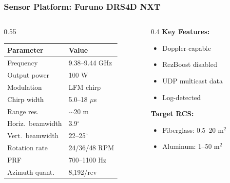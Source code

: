 \documentclass[aspectratio=169, 10pt]{beamer}
\begin{document}
\begin{frame}[shrink=20]
  \frametitle{Sensor Platform: Furuno DRS4D NXT}
  \vspace{-0.35cm}

  \begin{columns}[T]
    \begin{column}{0.55\textwidth}
      \begin{table}
        \centering
        \scriptsize
        \renewcommand{\arraystretch}{0.8}
        \begin{tabular}{@{}ll@{}}
          \toprule
          \textbf{Parameter} & \textbf{Value} \\
          \midrule
          Frequency & 9.38--9.44 GHz \\
          Output power & 100 W \\
          Modulation & LFM chirp \\
          Chirp width & 5.0--18 $\mu$s \\
          Range res. & $\sim$20 m \\
          Horiz.\ beamwidth & 3.9$^{\circ}$ \\
          Vert.\ beamwidth & 22--25$^{\circ}$ \\
          Rotation rate & 24/36/48 RPM \\
          PRF & 700--1100 Hz \\
          Azimuth quant. & 8{,}192/rev \\
          \bottomrule
        \end{tabular}
      \end{table}
    \end{column}

    \begin{column}{0.4\textwidth}
      \footnotesize
      \textbf{Key Features:}
      \setlength{\itemsep}{0pt}
      \begin{itemize}
        \item Doppler-capable
        \item RezBoost disabled
        \item UDP multicast data
        \item Log-detected
      \end{itemize}

      \textbf{Target RCS:}
      \setlength{\itemsep}{0pt}
      \begin{itemize}
        \item Fiberglass: 0.5--20 m$^2$
        \item Aluminum: 1--50 m$^2$
      \end{itemize}
    \end{column}
  \end{columns}
\end{frame}
\end{document}
